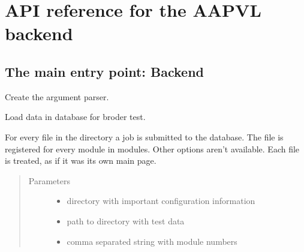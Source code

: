 \documentclass[letterpaper,10pt,english]{sphinxmanual}
\begin{document}
\chapter{API reference for the AAPVL backend}
\label{\detokenize{api::doc}}\label{\detokenize{api:api-reference-for-the-aapvl-backend}}

\section{The main entry point: Backend}
\label{\detokenize{api:the-main-entry-point-backend}}\label{\detokenize{api:module-backend}}

\begin{fulllineitems}
\label{\detokenize{api:backend.create_parser}}
Create the argument parser.

\end{fulllineitems}


\begin{fulllineitems}
\label{\detokenize{api:backend.load_db}}
Load data in database for broder test.

For every file in the directory a job is submitted to the
database. The file is registered for every module in
modules. Other options aren’t available. Each file is treated, as
if it was its own main page.
\begin{quote}\begin{description}
\item[{Parameters}] \leavevmode\begin{itemize}
\item {} 
 \textendash{} directory with important configuration information

\item {} 
 \textendash{} path to directory with test data

\item {} 
 \textendash{} comma separated string with module numbers

\end{itemize}

\end{description}\end{quote}

\end{fulllineitems}
\end{document}
